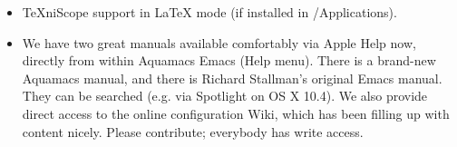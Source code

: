\begin{itemize}
\item TeXniScope support in LaTeX mode (if installed in /Applications).
 
	\item We have two great manuals available comfortably via Apple Help  now,
    directly from within Aquamacs Emacs (Help menu). There is a
    brand-new Aquamacs manual, and there is Richard
    Stallman's original Emacs manual. They can be searched (e.g. via
    Spotlight on OS X 10.4). We also provide direct access to the online configuration Wiki, which has been filling up with content nicely.  Please contribute; everybody has write access.

\end{itemize}



